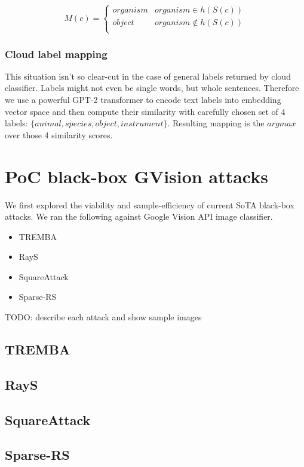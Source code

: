 \[ M(c) = \begin{cases} 
      organism & organism \in h(S(c)) \\
      object & organism \notin h(S(c)) \\
   \end{cases}
\]


\subsubsection{Cloud label mapping}
This situation isn't so clear-cut in the case of general labels returned by cloud classifier. Labels might not even be single words, but whole sentences. Therefore we use a powerful GPT-2 transformer to encode text labels into embedding vector space and then compute their similarity with carefully chosen set of 4 labels: $\{animal, species, object, instrument\}$. Resulting mapping is the $argmax$ over those 4 similarity scores.


\section{PoC black-box GVision attacks}
We first explored the viability and sample-efficiency of current SoTA black-box attacks. We ran the following against Google Vision API image classifier.

\begin{itemize}
    \item TREMBA
    \item RayS
    \item SquareAttack
    \item Sparse-RS
\end{itemize}

TODO: describe each attack and show sample images

\subsection{TREMBA}
\subsection{RayS}
\subsection{SquareAttack}
\subsection{Sparse-RS}



